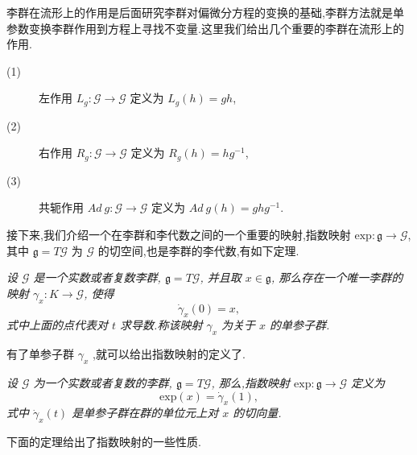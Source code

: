李群在流形上的作用是后面研究李群对偏微分方程的变换的基础,李群方法就是单参数变换李群作用到方程上寻找不变量.这里我们给出几个重要的李群在流形上的作用.
\begin{description}
	\item[(1)] 左作用 $L_g : \mathcal{G} \to \mathcal{G}$ 定义为 $L_g (h) = gh$,
	\item[(2)] 右作用 $R_g : \mathcal{G} \to \mathcal{G}$ 定义为 $R_g (h) = hg^{-1}$,
	\item[(3)] 共轭作用 $Ad~g: \mathcal{G} \to \mathcal{G}$ 定义为 $Ad~g(h) = ghg^{−1}$.
\end{description}

接下来,我们介绍一个在李群和李代数之间的一个重要的映射,指数映射 $\mathrm{exp}: \mathfrak{g}\to \mathcal{G}$, 其中 $\mathfrak{g}=T\mathcal{G}$ 为 $\mathcal{G}$ 的切空间,也是李群的李代数,有如下定理.
\begin{theorem}
	\emph{设 $\mathcal{G}$ 是一个实数或者复数李群, $\mathfrak{g}=T\mathcal{G}$, 并且取 $x\in\mathfrak{g}$, 那么存在一个唯一李群的映射 $\gamma_x : K \to \mathcal{G}$, 使得
	\begin{equation*}
		\dot{\gamma}_x(0)=x,
	\end{equation*}
式中上面的点代表对 $t$ 求导数.称该映射 $\gamma_x$ 为关于 $x$ 的单参子群.}
\end{theorem}

有了单参子群 $\gamma_x$ ,就可以给出指数映射的定义了.
\begin{definition}
	\emph{设 $\mathcal{G}$ 为一个实数或者复数的李群, $\mathfrak{g}=T\mathcal{G}$, 那么,指数映射 $\mathrm{exp}: \mathfrak{g}\to \mathcal{G}$ 定义为
	\begin{equation*}
		\mathrm{exp}(x)=\dot{\gamma}_x(1),
	\end{equation*}
	式中 $\dot{\gamma}_x(t)$ 是单参子群在群的单位元上对 $x$ 的切向量.}
\end{definition}

下面的定理给出了指数映射的一些性质.

